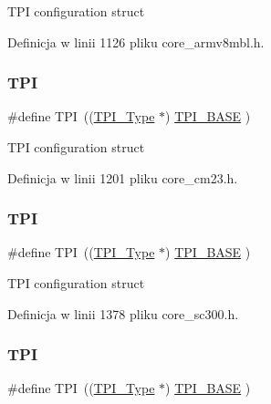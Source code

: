 T\+PI configuration struct 

Definicja w linii 1126 pliku core\+\_\+armv8mbl.\+h.

\mbox{\label{group___c_m_s_i_s__core__base_ga8b4dd00016aed25a0ea54e9a9acd1239}} 
\subsubsection{\texorpdfstring{T\+PI}{TPI}\hspace{0.1cm}{\footnotesize\ttfamily [2/8]}}
{\footnotesize\ttfamily \#define T\+PI~((\hyperlink{struct_t_p_i___type}{T\+P\+I\+\_\+\+Type}       $\ast$)     \hyperlink{group___c_m_s_i_s__core__base_ga2b1eeff850a7e418844ca847145a1a68}{T\+P\+I\+\_\+\+B\+A\+SE}         )}

T\+PI configuration struct 

Definicja w linii 1201 pliku core\+\_\+cm23.\+h.

\mbox{\label{group___c_m_s_i_s__core__base_ga8b4dd00016aed25a0ea54e9a9acd1239}} 
\subsubsection{\texorpdfstring{T\+PI}{TPI}\hspace{0.1cm}{\footnotesize\ttfamily [3/8]}}
{\footnotesize\ttfamily \#define T\+PI~((\hyperlink{struct_t_p_i___type}{T\+P\+I\+\_\+\+Type}       $\ast$)     \hyperlink{group___c_m_s_i_s__core__base_ga2b1eeff850a7e418844ca847145a1a68}{T\+P\+I\+\_\+\+B\+A\+SE}      )}

T\+PI configuration struct 

Definicja w linii 1378 pliku core\+\_\+sc300.\+h.

\mbox{\label{group___c_m_s_i_s__core__base_ga8b4dd00016aed25a0ea54e9a9acd1239}} 
\subsubsection{\texorpdfstring{T\+PI}{TPI}\hspace{0.1cm}{\footnotesize\ttfamily [4/8]}}
{\footnotesize\ttfamily \#define T\+PI~((\hyperlink{struct_t_p_i___type}{T\+P\+I\+\_\+\+Type}       $\ast$)     \hyperlink{group___c_m_s_i_s__core__base_ga2b1eeff850a7e418844ca847145a1a68}{T\+P\+I\+\_\+\+B\+A\+SE}      )}

